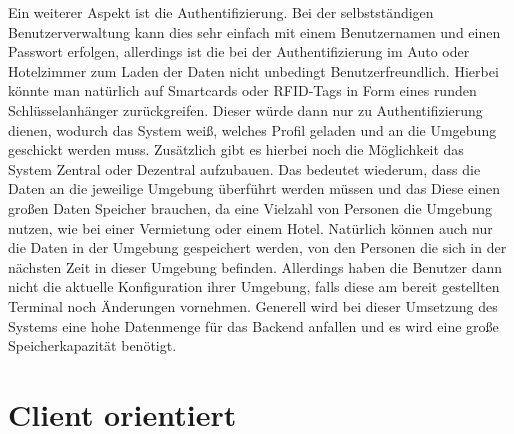 Ein weiterer Aspekt ist die Authentifizierung. Bei der selbstständigen Benutzerverwaltung kann dies sehr einfach mit einem Benutzernamen und einen Passwort erfolgen, allerdings ist die bei der Authentifizierung im Auto oder Hotelzimmer zum Laden der Daten nicht unbedingt Benutzerfreundlich. Hierbei könnte man natürlich auf Smartcards oder RFID-Tags in Form eines runden Schlüsselanhänger zurückgreifen. Dieser würde dann nur zu Authentifizierung dienen, wodurch das System weiß, welches Profil geladen und an die Umgebung geschickt werden muss. Zusätzlich gibt es hierbei noch die Möglichkeit das System Zentral oder Dezentral aufzubauen. Das bedeutet wiederum, dass die Daten an die jeweilige Umgebung überführt werden müssen und das Diese einen großen Daten Speicher brauchen, da eine Vielzahl von Personen die Umgebung nutzen, wie bei einer Vermietung oder einem Hotel. Natürlich können auch nur die Daten in der Umgebung gespeichert werden, von den Personen die sich in der nächsten Zeit in dieser Umgebung befinden. Allerdings haben die Benutzer dann nicht die aktuelle Konfiguration ihrer Umgebung, falls diese am bereit gestellten Terminal noch Änderungen vornehmen.  
Generell wird bei dieser Umsetzung des Systems eine hohe Datenmenge für das Backend anfallen und es wird eine große Speicherkapazität benötigt.

\section{Client orientiert}

